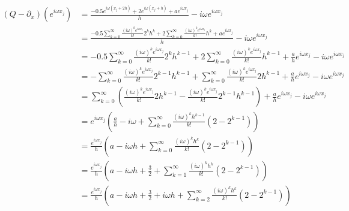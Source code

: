 \documentclass[11pt]{amsart}
\numberwithin{equation}{section}
\begin{document}
{\begin{align}
    (Q - \partial_x)(e^{i\omega x_j}) & = \frac{-0.5 e^{i \omega (x_j + 2h)} + 2 e^{i \omega (x_j + h)} + ae^{i \omega x_j}}{h} - i\omega e^{i\omega x_j}                                                                                         \\
                                      & = \frac{-0.5 \sum_{k=0}^\infty \frac{(i\omega)^k e^{i\omega x_j}}{k!} 2^k h^k + 2 \sum_{k=0}^\infty \frac{(i\omega)^k e^{i\omega x_j}}{k!} h^k + ae^{i \omega x_j}}{h} - i\omega e^{i\omega x_j}          \\
                                      & = -0.5 \sum_{k=0}^\infty \frac{(i\omega)^k e^{i\omega x_j}}{k!} 2^k h^{k-1} + 2 \sum_{k=0}^\infty \frac{(i\omega)^k e^{i\omega x_j}}{k!} h^{k-1} + \frac{a}{h}e^{i \omega x_j} - i\omega e^{i\omega x_j}  \\
                                      & = - \sum_{k=0}^\infty \frac{(i\omega)^k e^{i\omega x_j}}{k!} 2^{k-1} h^{k-1} + \sum_{k=0}^\infty \frac{(i\omega)^k e^{i\omega x_j}}{k!} 2 h^{k-1} + \frac{a}{h}e^{i \omega x_j} - i\omega e^{i\omega x_j} \\
                                      & =  \sum_{k=0}^\infty \left( \frac{(i\omega)^k e^{i\omega x_j}}{k!} 2h^{k-1} - \frac{(i\omega)^k e^{i\omega x_j}}{k!} 2^{k-1} h^{k-1} \right) + \frac{a}{h}e^{i \omega x_j} - i\omega e^{i\omega x_j}      \\
                                      & = e^{i\omega x_j} \left( \frac{a}{h} - i\omega + \sum_{k=0}^\infty \frac{(i\omega)^k h^{k-1}}{k!} \left(2 - 2^{k-1} \right) \right)                                                                       \\
                                      & = \frac{e^{i\omega x_j}}{h} \left(a - i\omega h + \sum_{k=0}^\infty \frac{(i\omega)^k h^k}{k!} \left(2 - 2^{k-1} \right) \right)                                                                          \\
                                      & = \frac{e^{i\omega x_j}}{h} \left(a - i\omega h + \frac{3}{2} + \sum_{k=1}^\infty \frac{(i\omega)^k h^k}{k!} \left(2 - 2^{k-1} \right) \right)                                                            \\
                                      & = \frac{e^{i\omega x_j}}{h} \left(a - i\omega h + \frac{3}{2} + i\omega h + \sum_{k=2}^\infty \frac{(i\omega)^k h^k}{k!} \left(2 - 2^{k-1} \right) \right)                                                \\

\end{align}}
\end{document}
